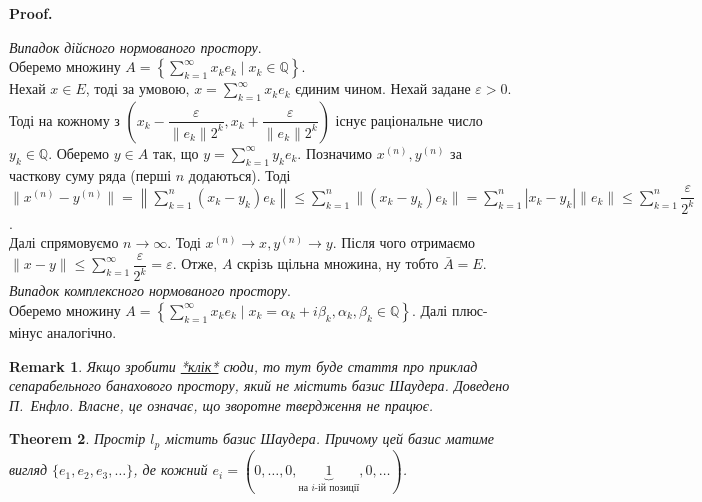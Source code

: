 \documentclass[a4paper, 10pt]{article}
\makeatletter
\theoremstyle{theoremdd}
\newtheorem{theorem}{Theorem}[subsection]
\theoremstyle{theoremdd}
\theoremstyle{theoremdd}
\theoremstyle{theoremdd}
\theoremstyle{theoremdd}
\theoremstyle{theoremdd}
\newtheorem{remark}[theorem]{Remark}
\theoremstyle{theoremdd}
\theoremstyle{theoremdd}
\renewenvironment{proof}[1][Proof.\\]{\par
\pushQED{\hfill \qed}%
\normalfont \topsep6\p@\@plus6\p@\relax
\trivlist
\item\relax
{\bfseries
#1\@addpunct{.}}\hspace\labelsep\ignorespaces
}{%
\popQED\endtrivlist\@endpefalse
}
\makeatother
\begin{document}
\begin{proof}
\textit{Випадок дійсного нормованого простору}.\\
Оберемо множину $A = \left\{ \displaystyle\sum_{k=1}^\infty x_k e_k \mid x_k \in \mathbb{Q} \right\}$.\\
Нехай $x \in E$, тоді за умовою, $x = \displaystyle\sum_{k=1}^\infty x_k e_k$ єдиним чином. Нехай задане $\varepsilon > 0$. Тоді на кожному з $\left(x_k-\dfrac{\varepsilon}{\|e_k\| 2^k},x_k + \dfrac{\varepsilon}{\|e_k\| 2^k} \right)$ існує раціональне число $y_k \in \mathbb{Q}$. Оберемо $y \in A$ так, що $y = \displaystyle\sum_{k=1}^\infty y_k e_k$. Позначимо $x^{(n)},y^{(n)}$ за часткову суму ряда (перші $n$ додаються). Тоді\\
$\|x^{(n)} - y^{(n)}\| = \displaystyle\left\| \sum_{k=1}^n (x_k-y_k) e_k \right\| \leq \sum_{k=1}^n \| (x_k-y_k) e_k \| = \sum_{k=1}^n |x_k-y_k| \|e_k\| \leq \sum_{k=1}^n \dfrac{\varepsilon}{2^k}$.\\
Далі спрямовуємо $n \to \infty$. Тоді $x^{(n)} \to x, y^{(n)} \to y$. Після чого отримаємо $\|x-y\| \displaystyle \leq \sum_{k=1}^\infty \dfrac{\varepsilon}{2^k} = \varepsilon$. Отже, $A$ скрізь щільна множина, ну тобто $\bar{A} = E$.
\bigskip \\
\textit{Випадок комплексного нормованого простору}.\\
Оберемо множину $A = \left\{ \displaystyle\sum_{k=1}^\infty x_k e_k \mid x_k = \alpha_k + i \beta_k, \alpha_k, \beta_k \in \mathbb{Q} \right\}$. Далі плюс-мінус аналогічно.
\end{proof}

\begin{remark}
Якщо зробити \textcolor{red}{\href{https://projecteuclid.org/download/pdf_1/euclid.acta/1485889774}{*клік*}} сюди, то тут буде стаття про приклад сепарабельного банахового простору, який не містить базис Шаудера. Доведено П.\ Енфло. Власне, це означає, що зворотне твердження не працює.
\end{remark}

\begin{theorem}
Простір $l_p$ містить базис Шаудера. Причому цей базис матиме вигляд $\{e_1,e_2,e_3,\dots\}$, де кожний $e_i = (0,\dots,0,\underbrace{1}_{\text{на $i$-ій позиції}},0,\dots)$.
\end{theorem}
\end{document}
